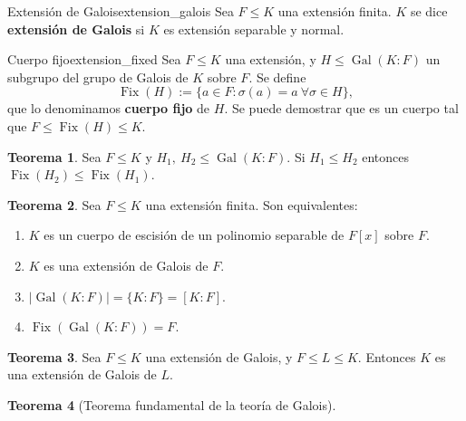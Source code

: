 \documentclass[a4paper]{book}
\theoremstyle{definition}
\newtheorem{theorem}{Teorema}[section]
\theoremstyle{ejemplo}
\theoremstyle{demostracion}
\DeclareMathOperator{\grupogalois}{Gal}
\DeclareMathOperator{\Fix}{Fix}
\begin{document}
\begin{define}{Extensión de Galois}{extension_galois}
	Sea $F \leq K$ una extensión finita. $K$ se dice \textbf{extensión de Galois} si $K$ es extensión separable y normal. 
\end{define}

\begin{define}{Cuerpo fijo}{extension_fixed}
	Sea $F \leq K$ una extensión, y $H \leq \grupogalois(K:F)$ un subgrupo del grupo de Galois de $K$ sobre $F$. Se define
	\begin{equation*}
		\Fix(H) := \{a \in F: \sigma(a) = a\ \forall \sigma \in H \},
	\end{equation*}
	que lo denominamos \textbf{cuerpo fijo} de $H$. Se puede demostrar que es un cuerpo tal que $F \leq \Fix(H) \leq K$.
\end{define}

\begin{theorem}
	Sea $F \leq K$ y $H_1,\ H_2 \leq \grupogalois(K:F)$. Si $H_1 \leq H_2$ entonces $\Fix(H_2) \leq \Fix(H_1)$.
\end{theorem}

\begin{theorem}
	Sea $F \leq K$ una extensión finita. Son equivalentes:
	\begin{enumerate}
		\item
		$K$ es un cuerpo de escisión de un polinomio separable de $F[x]$ sobre $F$.
		\item
		$K$ es una extensión de Galois de $F$.
		\item
		$|\grupogalois(K:F)| = \{K:F\} = [K:F]$.
		\item
		$\Fix(\grupogalois(K:F)) = F$.
	\end{enumerate}
\end{theorem}

\begin{theorem}
	Sea $F \leq K$ una extensión de Galois, y $F \leq L \leq K$. Entonces $K$ es una extensión de Galois de $L$.
\end{theorem}

\begin{theorem}[Teorema fundamental de la teoría de Galois]

\end{theorem}
\end{document}
